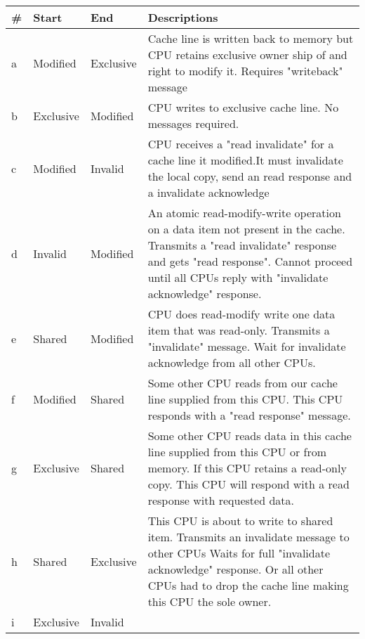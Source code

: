 \documentclass{article}
\begin{document}
\begin{center}
\begin{tabular} {| l | l | l | p{9cm}| }    
    \hline
    \# & Start  & End   & Descriptions \\
    \hline
    a & Modified  & Exclusive &
    Cache line is written back to memory but CPU retains exclusive 
    owner ship of and right to modify it. Requires "writeback" 
    message\\
    \hline
    b& Exclusive & Modified &  
    CPU writes to exclusive cache line. No messages required. \\
    \hline
    c & Modified & Invalid &   
    CPU receives a "read invalidate" for a cache line it modified.It 
    must invalidate the local copy, send an read response and a 
    invalidate acknowledge \\
    \hline
    d & Invalid & Modified &
    An atomic read-modify-write operation on a data item not present
    in the cache. Transmits a "read invalidate" response and gets
    "read response". Cannot proceed until all CPUs reply with
    "invalidate acknowledge" response.    \\

    \hline
    e & Shared & Modified & 

    CPU does read-modify write one data item that was
    read-only. Transmits a "invalidate" message. Wait for invalidate
    acknowledge from all other CPUs.    
    \\
    \hline
    f & Modified & Shared &

    Some other CPU reads from our cache line supplied from this
    CPU. This CPU responds with a "read response" message.    
    \\    
    \hline

    g & Exclusive & Shared & 


    Some other CPU reads data in this cache line supplied from this
    CPU or from memory. If this CPU retains a read-only copy. This CPU
    will respond with a read response with requested data.
    
    \\
    \hline
    h & Shared & Exclusive & 

    This CPU is about to write to shared item. Transmits an invalidate
    message to other CPUs Waits for full "invalidate acknowledge"
    response. Or all other CPUs had to drop the cache line making this
    CPU the sole owner. \\
    \hline
    i & Exclusive & Invalid & 


\end{tabular}
\end{center}
\end{document}

